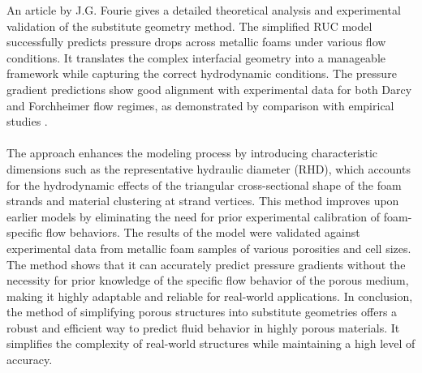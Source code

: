 \documentclass[a4paper]{article}
\begin{document}
\noindent An article by J.G. Fourie gives a detailed theoretical analysis and experimental validation of the substitute geometry method.
The simplified RUC model successfully predicts pressure drops across metallic foams under various flow conditions. It translates the complex interfacial geometry into a manageable framework while capturing the correct hydrodynamic conditions. The pressure gradient predictions show good alignment with experimental data for both Darcy and Forchheimer flow regimes, as demonstrated by comparison with empirical studies \cite{GFourie2002}.
\\
\\
\noindent The approach enhances the modeling process by introducing characteristic dimensions such as the representative hydraulic diameter (RHD), which accounts for the hydrodynamic effects of the triangular cross-sectional shape of the foam strands and material clustering at strand vertices. This method improves upon earlier models by eliminating the need for prior experimental calibration of foam-specific flow behaviors.
The results of the model were validated against experimental data from metallic foam samples of various porosities and cell sizes. The method shows that it can accurately predict pressure gradients without the necessity for prior knowledge of the specific flow behavior of the porous medium, making it highly adaptable and reliable for real-world applications.
In conclusion, the method of simplifying porous structures into substitute geometries offers a robust and efficient way to predict fluid behavior in highly porous materials. It simplifies the complexity of real-world structures while maintaining a high level of accuracy.
\end{document}
